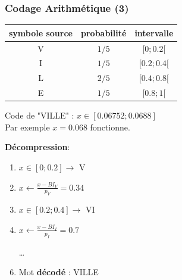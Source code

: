 \documentclass[aspectratio=43]{beamer}
\begin{document}
\begin{frame}
    \frametitle{Codage Arithmétique (3)}

    {
    \centering
    \begin{tabular}{c | c | c}
        symbole source & probabilité & intervalle  \\
        \hline
        V & $1/5$ & $[0; 0.2[$ \\ 
        I & $1/5$ & $[0.2; 0.4[$\\
        L & $2/5$ & $[0.4; 0.8[$\\
        E & $1/5$ & $[0.8; 1[$\\ \hline
    \end{tabular}\par
    }

    \vspace*{1em}

    Code de "VILLE" : $x \in [0.06752 ; 0.0688]$ \\
    Par exemple $x = 0.068$ fonctionne.

    \vspace*{1em}

    \textbf{Décompression}: \\
    \begin{enumerate}
        \item $x \in [0; 0.2] \rightarrow$ V
        \item $x \leftarrow \frac{x - BI_V}{p_V} = 0.34$
        \item $x \in [0.2; 0.4] \rightarrow$ VI
        \item $x \leftarrow \frac{x - BI_I}{p_I} = 0.7$
        \item [\dots] 
        \item Mot \textbf{décodé} : VILLE
    \end{enumerate}

\end{frame}
\end{document}
